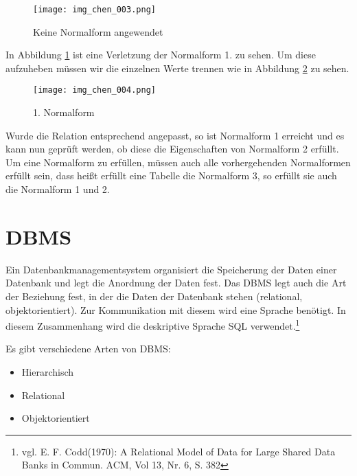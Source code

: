 \begin{figure}[H]
\begin{center}
\texttt{[image: img\_chen\_003.png]}
\caption{Keine Normalform angewendet}
\label{chenpic4}
\end{center}
\end{figure}



In Abbildung \ref{chenpic4} ist eine Verletzung der Normalform 1. zu sehen. Um diese aufzuheben müssen wir die einzelnen Werte trennen wie in Abbildung \ref{chenpic5} zu sehen.

\begin{figure}[H]
\begin{center}
\texttt{[image: img\_chen\_004.png]}
\caption{1. Normalform}
\label{chenpic5}
\end{center}
\end{figure}

Wurde die Relation entsprechend angepasst, so ist Normalform 1 erreicht und es kann nun geprüft werden,
ob diese die Eigenschaften von Normalform 2 erfüllt.
Um eine Normalform zu erfüllen, müssen auch alle vorhergehenden Normalformen erfüllt sein, dass heißt erfüllt eine Tabelle die Normalform 3, so erfüllt sie auch die Normalform 1 und 2.


\section{DBMS}
\label{sec:dbms}


Ein Datenbankmanagementsystem organisiert die Speicherung der Daten einer Datenbank und legt die Anordnung der Daten fest.
Das DBMS legt auch die Art der Beziehung fest, in der die Daten der Datenbank stehen (relational, objektorientiert).
Zur Kommunikation mit diesem wird eine Sprache benötigt. In diesem Zusammenhang wird die deskriptive Sprache SQL verwendet.\footnote{vgl. E. F. Codd(1970): A Relational Model of Data for Large Shared Data Banks in Commun. ACM, Vol 13, Nr. 6, S. 382}


Es gibt verschiedene Arten von DBMS:

\begin{itemize}
\item Hierarchisch
\item Relational
\item Objektorientiert
\end{itemize}

